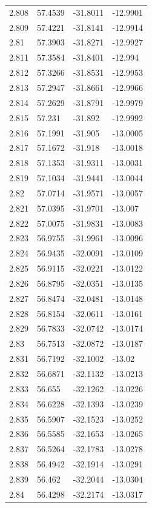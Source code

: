 \begin{tabular}{llll}
2.808 & 57.4539 & -31.8011 & -12.9901 \\
2.809 & 57.4221 & -31.8141 & -12.9914 \\
2.81 & 57.3903 & -31.8271 & -12.9927 \\
2.811 & 57.3584 & -31.8401 & -12.994 \\
2.812 & 57.3266 & -31.8531 & -12.9953 \\
2.813 & 57.2947 & -31.8661 & -12.9966 \\
2.814 & 57.2629 & -31.8791 & -12.9979 \\
2.815 & 57.231 & -31.892 & -12.9992 \\
2.816 & 57.1991 & -31.905 & -13.0005 \\
2.817 & 57.1672 & -31.918 & -13.0018 \\
2.818 & 57.1353 & -31.9311 & -13.0031 \\
2.819 & 57.1034 & -31.9441 & -13.0044 \\
2.82 & 57.0714 & -31.9571 & -13.0057 \\
2.821 & 57.0395 & -31.9701 & -13.007 \\
2.822 & 57.0075 & -31.9831 & -13.0083 \\
2.823 & 56.9755 & -31.9961 & -13.0096 \\
2.824 & 56.9435 & -32.0091 & -13.0109 \\
2.825 & 56.9115 & -32.0221 & -13.0122 \\
2.826 & 56.8795 & -32.0351 & -13.0135 \\
2.827 & 56.8474 & -32.0481 & -13.0148 \\
2.828 & 56.8154 & -32.0611 & -13.0161 \\
2.829 & 56.7833 & -32.0742 & -13.0174 \\
2.83 & 56.7513 & -32.0872 & -13.0187 \\
2.831 & 56.7192 & -32.1002 & -13.02 \\
2.832 & 56.6871 & -32.1132 & -13.0213 \\
2.833 & 56.655 & -32.1262 & -13.0226 \\
2.834 & 56.6228 & -32.1393 & -13.0239 \\
2.835 & 56.5907 & -32.1523 & -13.0252 \\
2.836 & 56.5585 & -32.1653 & -13.0265 \\
2.837 & 56.5264 & -32.1783 & -13.0278 \\
2.838 & 56.4942 & -32.1914 & -13.0291 \\
2.839 & 56.462 & -32.2044 & -13.0304 \\
2.84 & 56.4298 & -32.2174 & -13.0317 \\

\end{tabular}

